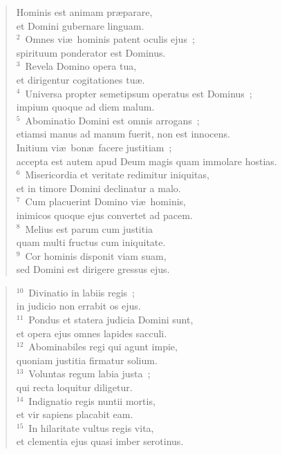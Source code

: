 \begin{flushleft}\begin{verse}\vspace{-19pt}\hspace{6pt}Hominis est animam pr\ae parare,\\\hspace{6pt} et Domini gubernare linguam.\\
${}^{2}$~Omnes vi\ae\ hominis patent oculis ejus~;\\ spirituum ponderator est Dominus.\\
${}^{3}$~Revela Domino opera tua,\\ et dirigentur cogitationes tu\ae .\\
${}^{4}$~Universa propter semetipsum operatus est Dominus~;\\ impium quoque ad diem malum.\\
${}^{5}$~Abominatio Domini est omnis arrogans~;\\ etiamsi manus ad manum fuerit, non est innocens.\\ Initium vi\ae\ bon\ae\ facere justitiam~;\\ accepta est autem apud Deum magis quam immolare hostias.\\
${}^{6}$~Misericordia et veritate redimitur iniquitas,\\ et in timore Domini declinatur a malo.\\
${}^{7}$~Cum placuerint Domino vi\ae\ hominis,\\ inimicos quoque ejus convertet ad pacem.\\
${}^{8}$~Melius est parum cum justitia\\ quam multi fructus cum iniquitate.\\
${}^{9}$~Cor hominis disponit viam suam,\\ sed Domini est dirigere gressus ejus.\end{verse}\end{flushleft}


\begin{flushleft}\begin{verse}${}^{10}$~Divinatio in labiis regis~;\\ in judicio non errabit os ejus.\\
${}^{11}$~Pondus et statera judicia Domini sunt,\\ et opera ejus omnes lapides sacculi.\\
${}^{12}$~Abominabiles regi qui agunt impie,\\ quoniam justitia firmatur solium.\\
${}^{13}$~Voluntas regum labia justa~;\\ qui recta loquitur diligetur.\\
${}^{14}$~Indignatio regis nuntii mortis,\\ et vir sapiens placabit eam.\\
${}^{15}$~In hilaritate vultus regis vita,\\ et clementia ejus quasi imber serotinus.\end{verse}\end{flushleft}


